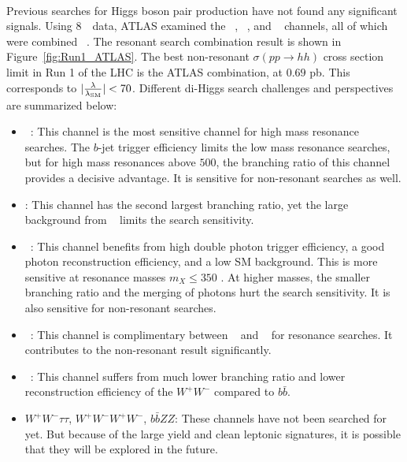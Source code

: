 \paragraph{}
Previous searches for Higgs boson pair production have not found any significant signals. 
Using 8~\TeV\ data, ATLAS examined the \bbbb~\cite{Aad:2015uka}, \bbgg~\cite{HIGG-2013-29}, \bbtautau and \WWgg~ channels, all of which were combined ~\cite{Aad:2015xja}. 
The resonant search combination result is shown in Figure~\ref{fig:Run1_ATLAS}. 
The best non-resonant $\sigma(pp \to hh)$ cross section limit in Run 1 of the LHC is the ATLAS combination, at $0.69$ pb. This corresponds to $|\frac{\rm \lambda}{\rm \lambda_{\rm SM}}| <70$. 
Different di-Higgs search challenges and perspectives are summarized below:
\begin{itemize}
	\item \bbbb~: This channel is the most sensitive channel for high mass resonance searches. 
  The $b$-jet trigger efficiency limits the low mass resonance searches, but for high mass resonances above $500$\GeV, the branching ratio of this channel provides a decisive advantage. 
  It is sensitive for non-resonant searches as well.
	\item \bbWW: This channel has the second largest branching ratio, yet the large background from \ttbar~ limits the search sensitivity.
	\item \bbgg~: This channel benefits from high double photon trigger efficiency, a good photon reconstruction efficiency, and a low SM background. 
  This is more sensitive at resonance masses $m_{X} \leq 350$ \GeV. 
  At higher masses, the smaller branching ratio and the merging of photons hurt the search sensitivity. 
  It is also sensitive for non-resonant searches.
	\item \bbtautau~: This channel is complimentary between \bbbb~ and \bbgg~ for resonance searches. It contributes to the non-resonant result significantly.
	\item \WWgg~: This channel suffers from much lower branching ratio and lower reconstruction efficiency of the $W^+W^-$ compared to $b\bar{b}$.
	\item $W^+W^-\tau\tau$, $W^+W^-W^+W^-$, $b\bar{b}ZZ$: These channels have not been searched for yet. 
  But because of the large yield and clean leptonic signatures, it is possible that they will be explored in the future.
\end{itemize}


